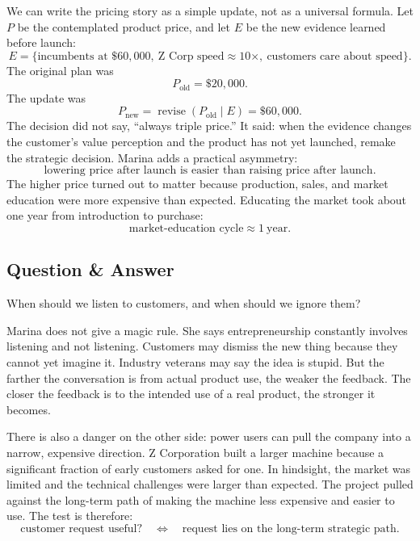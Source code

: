 We can write the pricing story as a simple update, not as a universal formula. Let \(P\) be the contemplated product price, and let \(E\) be the new evidence learned before launch:
\begin{equation}
E=
\{\text{incumbents at } \$60{,}000,\ 
\text{Z Corp speed}\approx 10\times,\ 
\text{customers care about speed}\}.
\end{equation}
The original plan was
\begin{equation}
P_{\text{old}}=\$20{,}000.
\end{equation}
The update was
\begin{equation}
P_{\text{new}}
=
\operatorname{revise}(P_{\text{old}}\mid E)
=
\$60{,}000.
\end{equation}
The decision did not say, ``always triple price.'' It said: when the evidence changes the customer's value perception and the product has not yet launched, remake the strategic decision. Marina adds a practical asymmetry:
\begin{equation}
\text{lowering price after launch is easier than raising price after launch}.
\end{equation}
The higher price turned out to matter because production, sales, and market education were more expensive than expected. Educating the market took about one year from introduction to purchase:
\begin{equation}
\text{market-education cycle}\approx 1\ \text{year}.
\end{equation}

\subsection{Question \& Answer}

When should we listen to customers, and when should we ignore them?

Marina does not give a magic rule. She says entrepreneurship constantly involves listening and not listening. Customers may dismiss the new thing because they cannot yet imagine it. Industry veterans may say the idea is stupid. But the farther the conversation is from actual product use, the weaker the feedback. The closer the feedback is to the intended use of a real product, the stronger it becomes.

There is also a danger on the other side: power users can pull the company into a narrow, expensive direction. Z Corporation built a larger machine because a significant fraction of early customers asked for one. In hindsight, the market was limited and the technical challenges were larger than expected. The project pulled against the long-term path of making the machine less expensive and easier to use. The test is therefore:
\begin{equation}
\text{customer request useful?}
\quad\Longleftrightarrow\quad
\text{request lies on the long-term strategic path}.
\end{equation}


